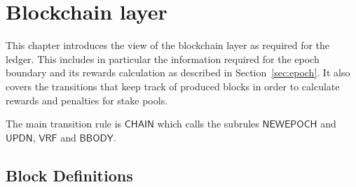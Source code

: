 \section{Blockchain layer}
\label{sec:chain}

This chapter introduces the view of the blockchain layer as required for the
ledger. This includes in particular the information required for the epoch
boundary and its rewards calculation as described in Section~\ref{sec:epoch}. It
also covers the transitions that keep track of produced blocks in order to
calculate rewards and penalties for stake pools.

The main transition rule is $\mathsf{CHAIN}$ which calls the subrules
$\mathsf{NEWEPOCH}$ and $\mathsf{UPDN}$, $\mathsf{VRF}$ and $\mathsf{BBODY}$.

\subsection{Block Definitions}
\label{sec:defs-blocks}

